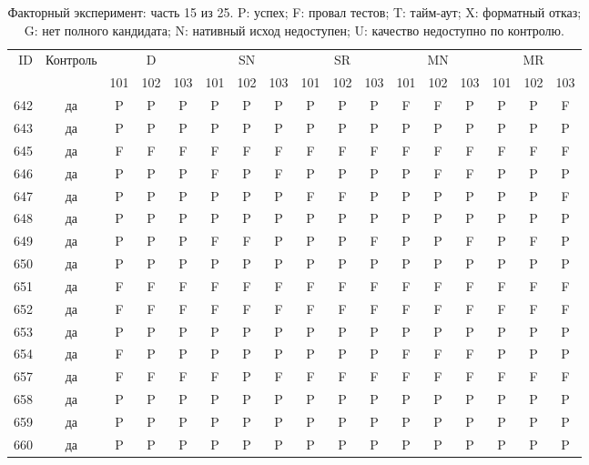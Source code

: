 \begin{table}[p]\centering\footnotesize
\setlength{\tabcolsep}{3pt}
\caption{Факторный эксперимент: часть 15 из 25. P: успех; F: провал тестов; T: тайм-аут; X: форматный отказ; G: нет полного кандидата; N: нативный исход недоступен; U: качество недоступно по контролю.}
\begin{tabular*}{\textwidth}{@{\extracolsep{\fill}}rcccccccccccccccc}\toprule
ID & Контроль & \multicolumn{3}{c}{D} & \multicolumn{3}{c}{SN} & \multicolumn{3}{c}{SR} & \multicolumn{3}{c}{MN} & \multicolumn{3}{c}{MR}\\
\cmidrule(lr){3-5}\cmidrule(lr){6-8}\cmidrule(lr){9-11}\cmidrule(lr){12-14}\cmidrule(lr){15-17}
 & & 101 & 102 & 103 & 101 & 102 & 103 & 101 & 102 & 103 & 101 & 102 & 103 & 101 & 102 & 103\\\midrule
642 & да & P & P & P & P & P & P & P & P & P & F & F & P & P & P & F\\
643 & да & P & P & P & P & P & P & P & P & P & P & P & P & P & P & P\\
645 & да & F & F & F & F & F & F & F & F & F & F & F & F & F & F & F\\
646 & да & P & P & P & F & P & F & P & P & P & P & F & F & P & P & P\\
647 & да & P & P & P & P & P & P & F & F & P & P & P & P & P & P & F\\
648 & да & P & P & P & P & P & P & P & P & P & P & P & P & P & P & P\\
649 & да & P & P & P & F & F & P & P & P & F & P & P & F & P & F & P\\
650 & да & P & P & P & P & P & P & P & P & P & P & P & P & P & P & P\\
651 & да & F & F & F & F & F & F & F & F & F & F & F & F & F & F & F\\
652 & да & F & F & F & F & F & F & F & F & F & F & F & F & F & F & F\\
653 & да & P & P & P & P & P & P & P & P & P & P & P & P & P & P & P\\
654 & да & F & P & P & P & P & P & P & P & P & F & F & F & P & P & P\\
657 & да & F & F & F & F & P & F & F & F & F & F & F & F & F & F & F\\
658 & да & P & P & P & P & P & P & P & P & P & P & P & P & P & P & P\\
659 & да & P & P & P & P & P & P & P & P & P & P & P & P & P & P & P\\
660 & да & P & P & P & P & P & P & P & P & P & P & P & P & P & P & P\\

\end{tabular*}
\end{table}
